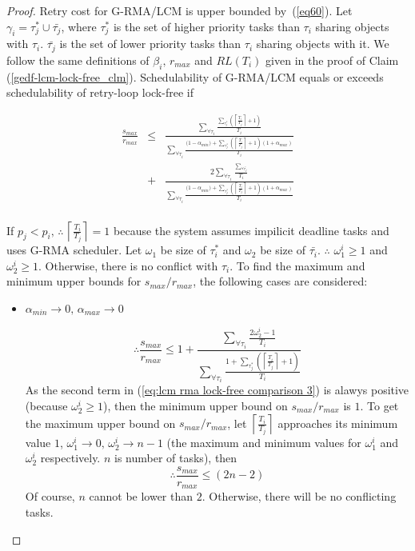 \begin{proof}

Retry cost for G-RMA/LCM is upper bounded by~(\ref{eq60}). Let $\gamma_{i}=\tau_{j}^{*}\cup\bar{\tau_{j}}$,
where $\tau_{j}^{*}$ is the set of higher priority tasks than $\tau_{i}$
sharing objects with $\tau_{i}$. $\bar{\tau_{j}}$ is the set
of lower priority tasks than $\tau_{i}$ sharing objects with
it. We follow the same definitions of $\beta_{i},\, r_{max}$ and
$RL(T_{i})$ given in the proof of Claim (\ref{gedf-lcm-lock-free_clm}).
Schedulability of G-RMA/LCM equals or exceeds schedulability of retry-loop
lock-free if 

\begin{eqnarray}
\frac{s_{max}}{r_{max}} & \le & \frac{\sum_{\forall\tau_{i}}\frac{\sum_{\tau_{j}^{*}}\left(\left\lceil \frac{T_{i}}{T_{j}}\right\rceil +1\right)}{T_{i}}}{\sum_{\forall\tau_{i}}\frac{\Big(1-\alpha_{min}\Big)+\sum_{\tau_{j}^{*}}\left(\left\lceil \frac{T_{i}}{T_{j}}\right\rceil +1\right)\left(1+\alpha_{max}\right)}{T_{i}}}\nonumber\\
 & + & \frac{2\sum_{\forall\tau_{i}}\frac{\sum_{\forall\bar{\tau_{j}}}}{T_{i}}}{\sum_{\forall\tau_{i}}\frac{\Big(1-\alpha_{min}\Big)+\sum_{\tau_{j}^{*}}\left(\left\lceil \frac{T_{i}}{T_{j}}\right\rceil +1\right)\left(1+\alpha_{max}\right)}{T_{i}}}\nonumber\\
 & & \label{eq:lcm rma lock-free comparison 1} 
\end{eqnarray}


If $p_{j}<p_{i},\,\therefore\,\left\lceil \frac{T_{i}}{T_{j}}\right\rceil =1$
because the system assumes impilicit deadline tasks and uses G-RMA
scheduler. 
%
Let $\omega_{1}$ be size of $\tau_i^*$ and $\omega_{2}$
be size of $\bar{\tau_i}$. $\therefore$ $\omega_{1}^{i}\ge 1$ and $\omega_{2}^{i}\ge1$.
Otherwise, there is no conflict with $\tau_{i}$. To find the maximum
and minimum upper bounds for $s_{max}/r_{max}$, the following cases
are considered:
\begin{itemize}
\item $\alpha_{min}\rightarrow0,\,\alpha_{max}\rightarrow0$


\begin{equation}
\therefore\frac{s_{max}}{r_{max}}\le1+\frac{\sum_{\forall\tau_{i}}\frac{2\omega_{2}^{i}-1}{T_{i}}}{\sum_{\forall\tau_{i}}\frac{1+\sum_{\tau_{j}^{*}}\left(\left\lceil \frac{T_{i}}{T_{j}}\right\rceil +1\right)}{T_{i}}}\label{eq:lcm rma lock-free comparison 3}
\end{equation}
As the second term in (\ref{eq:lcm rma lock-free comparison 3}) is
alawys positive (because $\omega_{2}^{i}\ge1$), then the minimum
upper bound on $s_{max}/r_{max}$ is $1$. To get the maximum upper
bound on $s_{max}/r_{max}$, let $\left\lceil \frac{T_{i}}{T_{j}}\right\rceil $
approaches its minimum value $1$, $\omega_{1}^{i}\rightarrow0,\,\omega_{2}^{i}\rightarrow n-1$ (the
maximum and minimum values for $\omega_{1}^{i}$ and $\omega_{2}^{i}$
respectively. $n$ is number of tasks), then 
\[
\therefore\frac{s_{max}}{r_{max}}\le\left(2n-2\right)
\]
Of course, $n$ cannot be lower than $2$. Otherwise, there will be
no conflicting tasks.


\end{itemize}
\end{proof}
